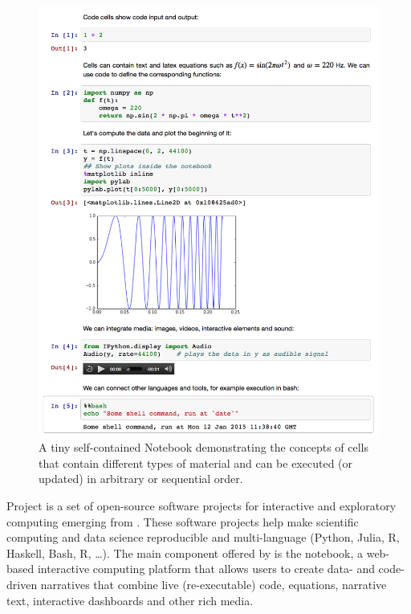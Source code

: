 \label{sec:jupyter}

\begin{figure}
\includegraphics[scale=0.23]{Pictures/jupyterdemo1.png}
\caption{\label{fig:jupyterdemo} A tiny self-contained Notebook demonstrating the concepts of cells that contain different types of material and can be executed (or updated) in arbitrary or sequential order.}
\end{figure}

Project \Jupyter is a set of open-source software projects for
interactive and exploratory computing emerging from \IPython. These
software projects help make scientific computing and data science
reproducible and multi-language (Python, Julia, R, Haskell, Bash, R,
\ldots). The main component offered by \Jupyter is the \Jupyter
notebook, a web-based interactive computing platform that allows users
to create data- and code-driven narratives that combine live
(re-executable) code, equations, narrative text, interactive
dashboards and other rich media.

